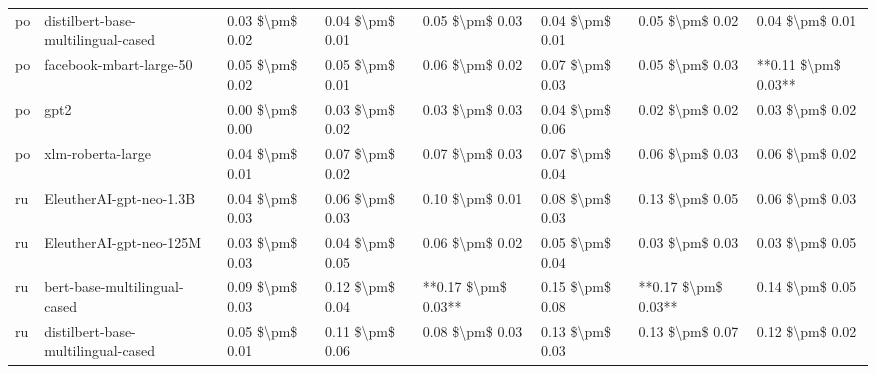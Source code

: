 \begin{tabular}{llllllll}
      po & distilbert-base-multilingual-cased & 0.03 \$\textbackslash pm\$ 0.02 &           0.04 \$\textbackslash pm\$ 0.01 &       0.05 \$\textbackslash pm\$ 0.03 &        0.04 \$\textbackslash pm\$ 0.01 &                         0.05 \$\textbackslash pm\$ 0.02 &     0.04 \$\textbackslash pm\$ 0.01 \\
      po &            facebook-mbart-large-50 & 0.05 \$\textbackslash pm\$ 0.02 &           0.05 \$\textbackslash pm\$ 0.01 &       0.06 \$\textbackslash pm\$ 0.02 &        0.07 \$\textbackslash pm\$ 0.03 &                         0.05 \$\textbackslash pm\$ 0.03 & **0.11 \$\textbackslash pm\$ 0.03** \\
      po &                               gpt2 & 0.00 \$\textbackslash pm\$ 0.00 &           0.03 \$\textbackslash pm\$ 0.02 &       0.03 \$\textbackslash pm\$ 0.03 &        0.04 \$\textbackslash pm\$ 0.06 &                         0.02 \$\textbackslash pm\$ 0.02 &     0.03 \$\textbackslash pm\$ 0.02 \\
      po &                  xlm-roberta-large & 0.04 \$\textbackslash pm\$ 0.01 &           0.07 \$\textbackslash pm\$ 0.02 &       0.07 \$\textbackslash pm\$ 0.03 &        0.07 \$\textbackslash pm\$ 0.04 &                         0.06 \$\textbackslash pm\$ 0.03 &     0.06 \$\textbackslash pm\$ 0.02 \\
      ru &            EleutherAI-gpt-neo-1.3B & 0.04 \$\textbackslash pm\$ 0.03 &           0.06 \$\textbackslash pm\$ 0.03 &       0.10 \$\textbackslash pm\$ 0.01 &        0.08 \$\textbackslash pm\$ 0.03 &                         0.13 \$\textbackslash pm\$ 0.05 &     0.06 \$\textbackslash pm\$ 0.03 \\
      ru &            EleutherAI-gpt-neo-125M & 0.03 \$\textbackslash pm\$ 0.03 &           0.04 \$\textbackslash pm\$ 0.05 &       0.06 \$\textbackslash pm\$ 0.02 &        0.05 \$\textbackslash pm\$ 0.04 &                         0.03 \$\textbackslash pm\$ 0.03 &     0.03 \$\textbackslash pm\$ 0.05 \\
      ru &       bert-base-multilingual-cased & 0.09 \$\textbackslash pm\$ 0.03 &           0.12 \$\textbackslash pm\$ 0.04 &   **0.17 \$\textbackslash pm\$ 0.03** &        0.15 \$\textbackslash pm\$ 0.08 &                     **0.17 \$\textbackslash pm\$ 0.03** &     0.14 \$\textbackslash pm\$ 0.05 \\
      ru & distilbert-base-multilingual-cased & 0.05 \$\textbackslash pm\$ 0.01 &           0.11 \$\textbackslash pm\$ 0.06 &       0.08 \$\textbackslash pm\$ 0.03 &        0.13 \$\textbackslash pm\$ 0.03 &                         0.13 \$\textbackslash pm\$ 0.07 &     0.12 \$\textbackslash pm\$ 0.02 \\

\end{tabular}
